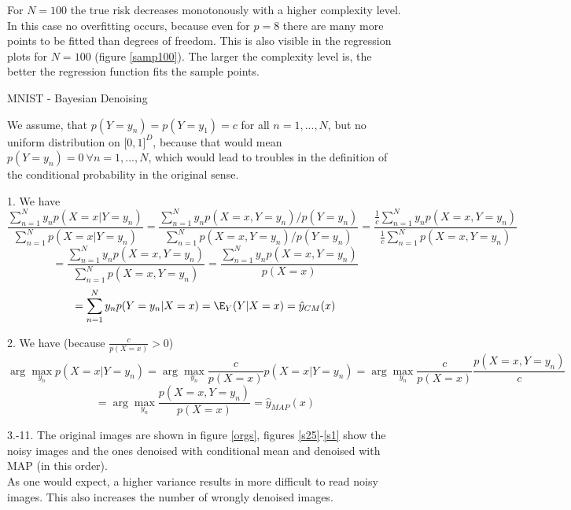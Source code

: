 \documentclass[english]{exercisesheet}
\begin{document}
\begin{solution}
For $N=100$ the true risk decreases monotonously with a higher complexity level. In this case no overfitting occurs, because even for $p=8$ there are many more points to be fitted than degrees of freedom. This is also visible in the regression plots for $N=100$ (figure \ref{samp100}). The larger the complexity level is, the better the regression function fits the sample points.
\end{solution}

\newpage
\begin{nexercise}{MNIST - Bayesian Denoising}
\end{nexercise}
\begin{solution}
 We assume, that $p(Y=y_n)=p(Y=y_1)=c$ for all $n=1,...,N$, but no uniform distribution on $\lbrack 0,1\rbrack^D$, because that would mean $p(Y=y_n)=0~\forall n=1,...,N$, which would lead to troubles in the definition of the conditional probability in the original sense.
 \par1. We have
 \begin{equation*}
  \frac{\sum_{n=1}^N y_np(X=x|Y=y_n)}{\sum_{n=1}^N p(X=x|Y=y_n)}=\frac{\sum_{n=1}^N y_np(X=x,Y=y_n)/p(Y=y_n)}{\sum_{n=1}^N p(X=x,Y=y_n)/p(Y=y_n)}=\frac{\frac{1}{c}\sum_{n=1}^N y_np(X=x,Y=y_n)}{\frac{1}{c}\sum_{n=1}^N p(X=x,Y=y_n)}
 \end{equation*}
\begin{equation*}
 =\frac{\sum_{n=1}^N y_np(X=x,Y=y_n)}{\sum_{n=1}^N p(X=x,Y=y_n)}=\frac{\sum_{n=1}^N y_np(X=x,Y=y_n)}{p(X=x)}
 \end{equation*}
 \begin{equation*}
 =\sum_{n=1}^N y_n p(Y=y_n|X=x)=\E_Y(Y|X=x)=\hat{y}_{CM}(x)
\end{equation*}
\par2. We have (because $\frac{c}{p(X=x)}>0$)
\begin{equation*}
 \arg \max_{y_n} p(X=x|Y=y_n) = \arg \max_{y_n} \frac{c}{p(X=x)}p(X=x|Y=y_n)=\arg \max_{y_n} \frac{c}{p(X=x)}\frac{p(X=x,Y=y_n)}{c}
\end{equation*}
\begin{equation*}
 =\arg \max_{y_n} \frac{p(X=x,Y=y_n)}{p(X=x)}=\hat{y}_{MAP}(x)
\end{equation*}
\par3.-11. The original images are shown in figure \ref{orgs}, figures \ref{s25}-\ref{s1} show the noisy images and the ones denoised with conditional mean and denoised with MAP (in this order).\\
As one would expect, a higher variance results in more difficult to read noisy images. This also increases the number of wrongly denoised images.\\

\end{solution}
\end{document}
